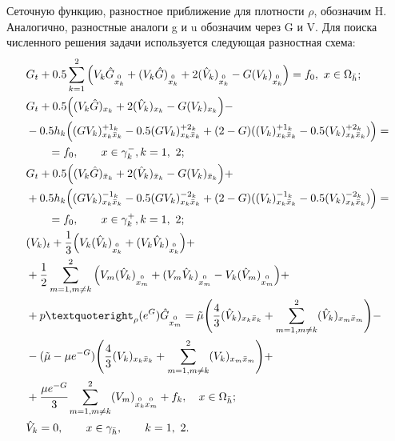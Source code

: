 \documentclass[a4paper,12pt]{extarticle}
\begin{document}
Сеточную функцию, разностное приближение для плотности $\rho$, обозначим H. Аналогично, разностные аналоги g и u обозначим через G и V. Для поиска численного решения задачи используется следующая разностная схема:
\begin{align*}
	& G_t + 0.5 \sum_{k=1}^{2}\Big(V_k \hat G_{\stackrel{0}{x_k}} + (V_k \hat G)_{\stackrel{0}{x_k}} 
	+ 2 (\hat V_k)_{\stackrel{0}{x_k}} - G(V_k)_{\stackrel{0}{x_k}} \Big) = f_0,\ x \in \Omega _{\bar h};\\
	& G_t + 0.5 \Big((V_k \hat G)_{x_k} + 2 (\hat V_k)_{x_k} - G(V_k)_{x_k}\Big) -\\
	& -0.5h_k \Big( (GV_k)_{x_k\bar x_k}^{+1_k} - 0.5(GV_k)_{x_k\bar x_k}^{+2_k}
	+ (2-G)((V_k)_{x_k\bar x_k}^{+1_k} - 0.5 (V_k)_{x_k\bar x_k}^{+2_k})\Big) = \\
	& \qquad = f_0, \qquad x \in \gamma_k^-, k = 1,\ 2;\\
	& G_t + 0.5 \Big((V_k \hat G)_{\bar x_k} + 2 (\hat V_k)_{\bar x_k} - G(V_k)_{\bar x_k}\Big) +\\
	& + 0.5h_k \Big( (GV_k)_{x_k\bar x_k}^{-1_k} - 0.5(GV_k)_{x_k\bar x_k}^{-2_k}
	+ (2-G)((V_k)_{x_k\bar x_k}^{-1_k} - 0.5 (V_k)_{x_k\bar x_k}^{-2_k})\Big) = \\
	& \qquad = f_0, \qquad x \in \gamma_k^+, k = 1,\ 2;\\
	& (V_k)_t + \frac{1}{3}\Big( V_k(\hat V_k)_{\stackrel{0}{x_k}} + (V_k \hat V_k)_{\stackrel{0}{x_k}} \Big) +\\
	& + \frac{1}{2}\sum_{m=1,m\neq k}^{2}\Big( 
	V_m(\hat V_k)_{\stackrel{0}{x_m}} + (V_m \hat V_k)_{\stackrel{0}{x_m}} - V_k(\hat V_m)_{\stackrel{0}{x_m}} \Big) +\\
	& + p’_{\rho }(e^{G})\hat G_{\stackrel{0}{x_m}} = \tilde{\mu} \Bigg( \frac{4}{3}(\hat V_k)_{x_k\bar x_k}
	+ \sum_{m=1,m\neq k}^{2}(\hat V_k)_{x_m\bar x_m} \Bigg) -\\
	& - (\tilde{\mu} - \mu e^{-G}) \Bigg( \frac{4}{3}(V_k)_{x_k\bar x_k} + \sum_{m=1,m\neq k}^{2}(V_k)_{x_m\bar x_m}
	\Bigg) +\\
	& + \cfrac{\mu e^{-G}}{3} \sum_{m=1,m\neq k}^{2}(V_m)_{\stackrel{0}{x_k} \stackrel{0}{x_m}} + f_k,\quad x\in \Omega_{\bar h};\\
	& \hat V_k = 0, \qquad x \in \gamma_{\bar h}, \qquad k = 1,\ 2.
\end{align*}
\end{document}
